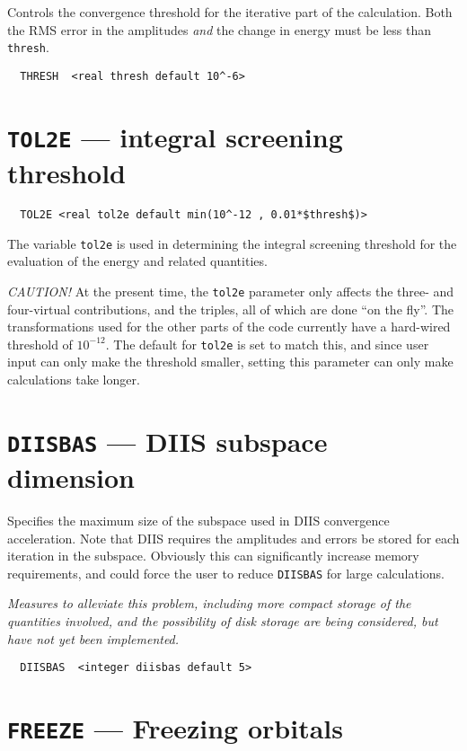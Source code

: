 Controls the convergence threshold for the iterative part of the
calculation.  Both the RMS error in the amplitudes {\em and} the
change in energy must be less than {\tt thresh}.

\begin{verbatim}
  THRESH  <real thresh default 10^-6>
\end{verbatim}

\section{{\tt TOL2E} --- integral screening threshold}

\begin{verbatim}
  TOL2E <real tol2e default min(10^-12 , 0.01*$thresh$)>
\end{verbatim}

The variable \verb+tol2e+ is used in determining the integral
screening threshold for the evaluation of the energy and related
quantities.

{\em CAUTION!}  At the present time, the \verb+tol2e+ parameter only
affects the three- and four-virtual contributions, and the triples,
all of which are done ``on the fly''. The transformations
used for the other parts of the code currently have a hard-wired
threshold of $10^{-12}$.  The default for \verb+tol2e+ is set to match
this, and since user input can only make the threshold smaller,
setting this parameter can only make calculations take longer.

\section{{\tt DIISBAS} --- DIIS subspace dimension}

Specifies the maximum size of the subspace used in DIIS convergence
acceleration.  Note that DIIS requires the amplitudes and errors be
stored for each iteration in the subspace.  Obviously this can
significantly increase memory requirements, and could force the user
to reduce \verb+DIISBAS+ for large calculations.

{\em Measures to alleviate this problem, including more compact
storage of the quantities involved, and the possibility of disk
storage are being considered, but have not yet been implemented.}

\begin{verbatim}
  DIISBAS  <integer diisbas default 5>
\end{verbatim}

\section{{\tt FREEZE} --- Freezing orbitals}

